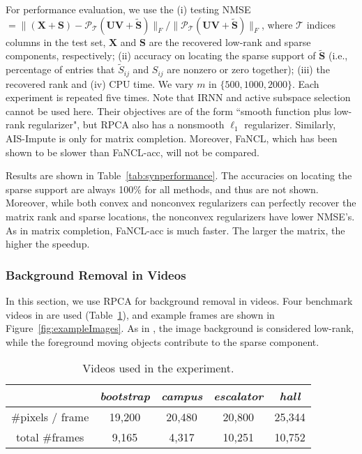 \documentclass[10pt,journal,compsoc]{IEEEtran}
\newcommand{\X}{\mathbf{X}}
\newcommand{\NM}[2]{\| #1 \|_{#2} }
\begin{document}
For performance evaluation, 
we use the
(i) testing NMSE
$=\NM{(\X + \mathbf{S}) - \mathcal{P}_{\mathcal{T}}(\mathbf{UV+\tilde{S}}) }{F} / 
\NM{ 
\mathcal{P}_{\mathcal{T}}(\mathbf{UV+\tilde{S}} ) }{F}$, 
where $\mathcal{T}$ indices columns in the test set,
$\mathbf{X}$ and $\mathbf{S}$
are the recovered low-rank and sparse components, respectively;
(ii) accuracy on locating the sparse support of $\tilde{\mathbf{S}}$ (i.e.,
percentage of entries that $\tilde{S}_{ij}$ and $S_{ij}$ are nonzero or zero together);
(iii) 
the recovered rank
and (iv) CPU time.
We vary $m$ in $\{500, 1000, 2000\}$.
Each experiment is repeated five times.
Note that \textsf{IRNN}  and active subspace selection cannot be used here.
Their objectives are of the form ``smooth function plus low-rank
regularizer", but RPCA  also has a nonsmooth $\ell_1$ regularizer.
Similarly, \textsf{AIS-Impute} is only for matrix completion.
Moreover,
\textsf{FaNCL},
which has been shown to be slower than \textsf{FaNCL-acc},
will not be compared.

Results are shown in Table~\ref{tab:synperformance}.
The accuracies on locating the sparse support
are always 100\% 
for all methods, and thus  are
not shown.
Moreover, while both convex and nonconvex regularizers can perfectly recover the matrix rank and
sparse locations,
the nonconvex regularizers have lower NMSE's.
As in matrix completion, \textsf{FaNCL-acc} is much faster.
The larger
the matrix, the higher 
the speedup.





\subsubsection{Background Removal in Videos}

In this section, we use RPCA for background removal in videos. Four benchmark 
videos in \cite{candes2011robust,sun2013robust}
are used
(Table~\ref{tab:sumVideo}), and example frames are shown in
Figure~\ref{fig:exampleImages}.
As in \cite{candes2011robust}, the image background is considered low-rank, while the foreground moving objects contribute to the 
sparse component.

\begin{table}[ht]
\centering
\caption{Videos used in the experiment.}
\vspace{-10px}
\begin{tabular}{c | c | c | c | c}
	\hline
	                 & {\em bootstrap} & {\em campus} & {\em escalator} & {\em hall} \\ \hline
	\#pixels / frame & 19,200          & 20,480       & 20,800          & 25,344     \\ \hline
	 total \#frames  & 9,165           & 4,317        & 10,251          & 10,752     \\ \hline
\end{tabular}
\label{tab:sumVideo}
\end{table}
\end{document}
